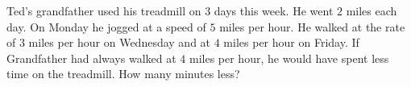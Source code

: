 Ted's grandfather used his treadmill on $3$ days this week. He went $2$ miles each day. On Monday he jogged at a speed of $5$ miles per hour. He walked at the rate of $3$ miles per hour on Wednesday and at $4$ miles per hour on Friday. If Grandfather had always walked at $4$ miles per hour, he would have spent less time on the treadmill. How many minutes less?
